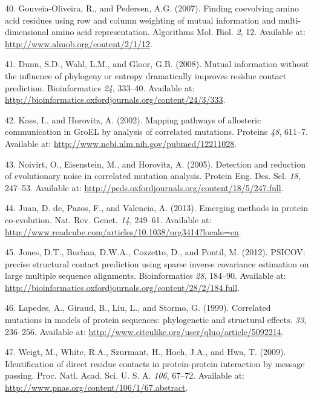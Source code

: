 \documentclass[12pt,a4paper,twoside]{book}
\theoremstyle{definition}
\theoremstyle{definition}
\theoremstyle{remark}
\begin{document}
\hypertarget{ref-Gouveia_Oliveira2007}{}
40. Gouveia-Oliveira, R., and Pedersen, A.G. (2007). Finding coevolving
amino acid residues using row and column weighting of mutual information
and multi-dimensional amino acid representation. Algorithms Mol. Biol.
\emph{2}, 12. Available at: \url{http://www.almob.org/content/2/1/12}.

\hypertarget{ref-Dunn2008}{}
41. Dunn, S.D., Wahl, L.M., and Gloor, G.B. (2008). Mutual information
without the influence of phylogeny or entropy dramatically improves
residue contact prediction. Bioinformatics \emph{24}, 333--40. Available
at: \url{http://bioinformatics.oxfordjournals.org/content/24/3/333}.

\hypertarget{ref-Kass2002}{}
42. Kass, I., and Horovitz, A. (2002). Mapping pathways of allosteric
communication in GroEL by analysis of correlated mutations. Proteins
\emph{48}, 611--7. Available at:
\url{http://www.ncbi.nlm.nih.gov/pubmed/12211028}.

\hypertarget{ref-Noivirt2005}{}
43. Noivirt, O., Eisenstein, M., and Horovitz, A. (2005). Detection and
reduction of evolutionary noise in correlated mutation analysis. Protein
Eng. Des. Sel. \emph{18}, 247--53. Available at:
\url{http://peds.oxfordjournals.org/content/18/5/247.full}.

\hypertarget{ref-DeJuan2013}{}
44. Juan, D. de, Pazos, F., and Valencia, A. (2013). Emerging methods in
protein co-evolution. Nat. Rev. Genet. \emph{14}, 249--61. Available at:
\url{http://www.readcube.com/articles/10.1038/nrg3414?locale=en}.

\hypertarget{ref-Jones2012}{}
45. Jones, D.T., Buchan, D.W.A., Cozzetto, D., and Pontil, M. (2012).
PSICOV: precise structural contact prediction using sparse inverse
covariance estimation on large multiple sequence alignments.
Bioinformatics \emph{28}, 184--90. Available at:
\url{http://bioinformatics.oxfordjournals.org/content/28/2/184.full}.

\hypertarget{ref-Lapedes1999}{}
46. Lapedes, A., Giraud, B., Liu, L., and Stormo, G. (1999). Correlated
mutations in models of protein sequences: phylogenetic and structural
effects. \emph{33}, 236--256. Available at:
\url{http://www.citeulike.org/user/qluo/article/5092214}.

\hypertarget{ref-Weigt2009}{}
47. Weigt, M., White, R.A., Szurmant, H., Hoch, J.A., and Hwa, T.
(2009). Identification of direct residue contacts in protein-protein
interaction by message passing. Proc. Natl. Acad. Sci. U. S. A.
\emph{106}, 67--72. Available at:
\url{http://www.pnas.org/content/106/1/67.abstract}.
\end{document}
